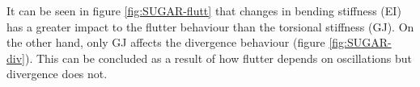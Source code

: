 \documentclass[11pt]{article}
\begin{document}
It can be seen in figure \ref{fig:SUGAR-flutt} that changes in bending stiffness (EI) has a greater impact to the flutter behaviour than the torsional stiffness (GJ). On the other hand, only GJ affects the divergence behaviour (figure \ref{fig:SUGAR-div}). This can be concluded as a result of how flutter depends on oscillations but divergence does not.

\end{document}
